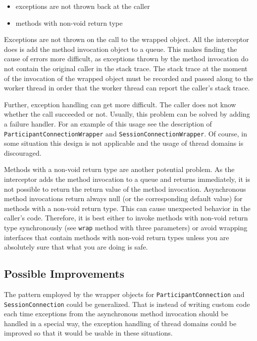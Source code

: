 \begin{itemize}
 \item exceptions are not thrown back at the caller
 \item methods with non-void return type
\end{itemize}

Exceptions are not thrown on the call to the wrapped object. All the 
interceptor does is add the method invocation object to a queue. This makes
finding the cause of errors more difficult, as exceptions thrown by the
method invocation do not contain the original caller in the stack trace.
The stack trace at the moment of the invocation of the wrapped object must
be recorded and passed along to the worker thread in order that the worker
thread can report the caller's stack trace. 

Further, exception handling can get more difficult. The caller does not
know whether the call succeeded or not. Usually, this problem can be solved
by adding a failure handler. For an example of this usage see the
description of \texttt{ParticipantConnectionWrapper} and 
\texttt{SessionConnectionWrapper}. Of course, in some situation this
design is not applicable and the usage of thread domains is discouraged.

Methods with a non-void return type are another potential problem. As the
interceptor adds the method invocation to a queue and returns immediately,
it is not possible to return the return value of the method invocation.
Asynchronous method invocations return always null (or the corresponding
default value) for methods with a non-void return type. This can cause
unexpected behavior in the caller's code. Therefore, it is best either to
invoke methods with non-void return type synchronously (see \texttt{wrap}
method with three parameters) or avoid wrapping interfaces that contain
methods with non-void return types unless you are absolutely sure that
what you are doing is safe.


\subsection{Possible Improvements}
The pattern employed by the wrapper objects for \texttt{ParticipantConnection}
and \texttt{SessionConnection} could be generalized. That is instead of
writing custom code each time exceptions from the asynchronous method invocation
should be handled in a special way, the exception handling of thread domains
could be improved so that it would be usable in these situations.

